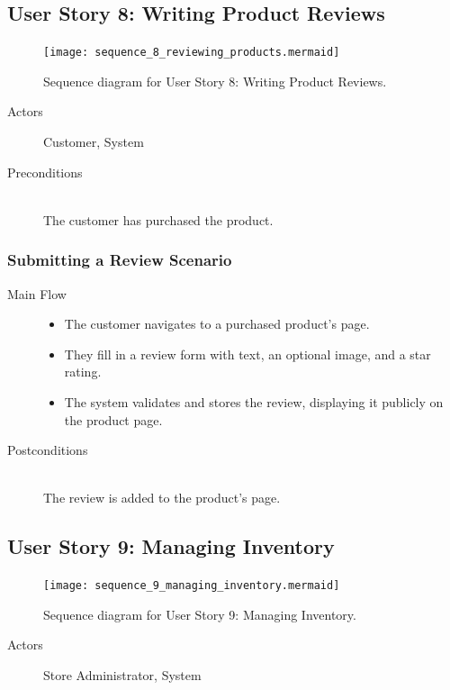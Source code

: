 \documentclass[twoside,a4paper,journal]{IEEEtran}
\begin{document}
\subsection{User Story 8: Writing Product Reviews}
\begin{figure}[!t]
\centering
\texttt{[image: sequence\_8\_reviewing\_products.mermaid]}
\caption{Sequence diagram for User Story 8: Writing Product Reviews.}
\label{fig:sequence_8}
\end{figure}
\begin{description}
  \item[Actors] Customer, System
  \item[Preconditions] \hfill \\ The customer has purchased the product.
\end{description}
\subsubsection{Submitting a Review Scenario}
\begin{description}
  \item[Main Flow] \hfill
    \begin{itemize}
      \item The customer navigates to a purchased product's page.
      \item They fill in a review form with text, an optional image, and a star
        rating.
      \item The system validates and stores the review, displaying it publicly
        on the product page.
    \end{itemize}
  \item[Postconditions] \hfill \\
    The review is added to the product's page.
\end{description}

\subsection{User Story 9: Managing Inventory}
\begin{figure}[!t]
\centering
\texttt{[image: sequence\_9\_managing\_inventory.mermaid]}
\caption{Sequence diagram for User Story 9: Managing Inventory.}
\label{fig:sequence_9}
\end{figure}
\begin{description}
  \item[Actors] Store Administrator, System
\end{description}
\end{document}

